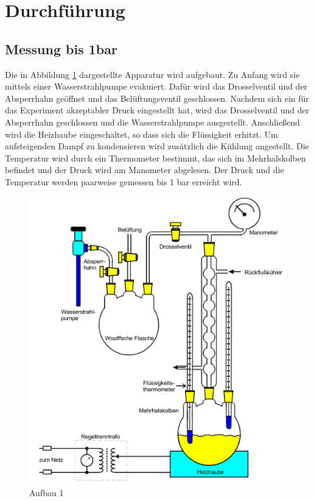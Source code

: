 \section{Durchführung}
\label{sec:Durchführung}

\subsection{Messung bis 1bar}
Die in Abbildung \ref{fig:aufbau1} dargestellte Apparatur wird aufgebaut. Zu Anfang wird sie mittels einer Wasserstrahlpumpe evakuiert.
Dafür wird das Drosselventil und der Absperrhahn geöffnet und das Belüftungsventil geschlossen. Nachdem sich ein für das Experiment akzeptabler Druck eingestellt hat, wird das
Drosselventil und der Absperrhahn geschlossen und die Wasserstrahlpumpe ausgestellt. Anschließend wird die Heizhaube eingeschaltet, so dass sich die Flüssigkeit erhitzt. Um 
aufsteigenden Dampf zu kondensieren wird zusätzlich die Kühlung angestellt. Die Temperatur wird durch ein Thermometer bestimmt, das sich im Mehrhalskolben befindet und der Druck
wird am Manometer abgelesen. Der Druck und die Temperatur werden paarweise gemessen bis 1 bar erreicht wird.
\begin{figure}
    \centering
    \includegraphics{Aufbau1.png}
    \caption{Aufbau 1 \cite{sample}}
    \label{fig:aufbau1}
\end{figure}


